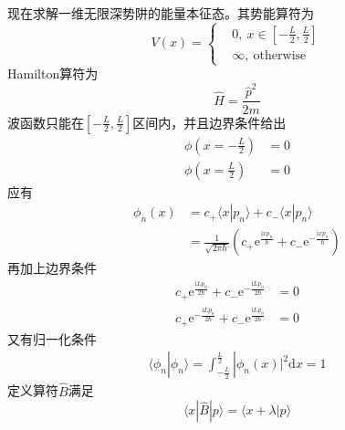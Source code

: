         现在求解一维无限深势阱的能量本征态。其势能算符为
        \begin{equation}
            V(x) = \left \{
                \begin{aligned}
                    &0,\ x\in [-\frac L2, \frac L2 ]\\
                    &\infty, \ \mathrm{otherwise}
                \end{aligned}
                \right.
        \end{equation}
        Hamilton算符为
        \begin{equation}
            \hat{H} = \frac {\hat{p}^2}{2m}
        \end{equation}
        波函数只能在$[-\frac L2, \frac L2 ]$区间内，并且边界条件给出
        \begin{equation}\begin{aligned}
            \phi(x = -\frac L2) &= 0\\
            \phi(x = \frac L2) &= 0
        \end{aligned}\end{equation}
        应有
        \begin{equation}\begin{aligned}
            \phi_n(x) &= c_+ \langle x|p_n\rangle + c_- \langle x|p_n\rangle\\
            &= \frac 1{\sqrt{2\pi \hbar}}(c_+\mathrm{e}^{\frac {\mathrm{i}xp_n}{\hbar}}+c_-\mathrm{e}^{-\frac {\mathrm{i}xp_n}{\hbar}})
        \end{aligned}\end{equation}
        再加上边界条件
        \begin{equation}\begin{aligned}
            c_+\mathrm{e}^{\frac {\mathrm{i}Lp_n}{2\hbar}}+c_-\mathrm{e}^{-\frac {\mathrm{i}Lp_n}{2\hbar}} &= 0\\
            c_+\mathrm{e}^{-\frac {\mathrm{i}Lp_n}{2\hbar}}+c_-\mathrm{e}^{\frac {\mathrm{i}Lp_n}{2\hbar}} &= 0
        \end{aligned}\end{equation}
        又有归一化条件
        \begin{equation}\begin{aligned}
            \langle \phi_n | \phi_n \rangle = \int_{-\frac L2}^{\frac L2} |\phi_n(x)|^2 \mathrm{d}x = 1
        \end{aligned}\end{equation}
        定义算符$\hat{B}$满足
        \[ \langle x|\hat{B}| p \rangle = \langle x+\lambda |p\rangle \]
